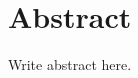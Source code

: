 \documentclass[a4paper,11pt,oneside,openany,fleqn]{jsbook}
\begin{document}
    \chapter*{Abstract}
        Write abstract here.
\end{document}
